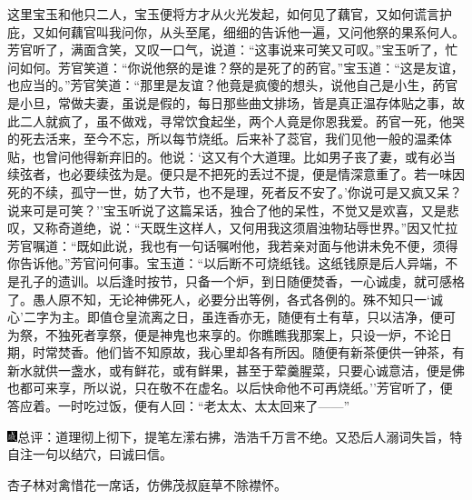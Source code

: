 这里宝玉和他只二人，宝玉便将方才从火光发起，如何见了藕官，又如何谎言护庇，又如何藕官叫我问你，从头至尾，细细的告诉他一遍，又问他祭的果系何人。芳官听了，满面含笑，又叹一口气，说道：``这事说来可笑又可叹。''宝玉听了，忙问如何。芳官笑道：``你说他祭的是谁？祭的是死了的菂官。''宝玉道：``这是友谊，也应当的。''芳官笑道：``那里是友谊？他竟是疯傻的想头，说他自己是小生，菂官是小旦，常做夫妻，虽说是假的，每日那些曲文排场，皆是真正温存体贴之事，故此二人就疯了，虽不做戏，寻常饮食起坐，两个人竟是你恩我爱。菂官一死，他哭的死去活来，至今不忘，所以每节烧纸。后来补了蕊官，我们见他一般的温柔体贴，也曾问他得新弃旧的。他说：`这又有个大道理。比如男子丧了妻，或有必当续弦者，也必要续弦为是。便只是不把死的丢过不提，便是情深意重了。若一味因死的不续，孤守一世，妨了大节，也不是理，死者反不安了。'你说可是又疯又呆？说来可是可笑？''宝玉听说了这篇呆话，独合了他的呆性，不觉又是欢喜，又是悲叹，又称奇道绝，说：``天既生这样人，又何用我这须眉浊物玷辱世界。''因又忙拉芳官嘱道：``既如此说，我也有一句话嘱咐他，我若亲对面与他讲未免不便，须得你告诉他。''芳官问何事。宝玉道：``以后断不可烧纸钱。这纸钱原是后人异端，不是孔子的遗训。以后逢时按节，只备一个炉，到日随便焚香，一心诚虔，就可感格了。愚人原不知，无论神佛死人，必要分出等例，各式各例的。殊不知只一`诚心'二字为主。即值仓皇流离之日，虽连香亦无，随便有土有草，只以洁净，便可为祭，不独死者享祭，便是神鬼也来享的。你瞧瞧我那案上，只设一炉，不论日期，时常焚香。他们皆不知原故，我心里却各有所因。随便有新茶便供一钟茶，有新水就供一盏水，或有鲜花，或有鲜果，甚至于荤羹腥菜，只要心诚意洁，便是佛也都可来享，所以说，只在敬不在虚名。以后快命他不可再烧纸。''芳官听了，便答应着。一时吃过饭，便有人回：``老太太、太太回来了------''

{\includegraphics[width=3mm]{../Images/00005}总评：道理彻上彻下，提笔左潆右拂，浩浩千万言不绝。又恐后人溺词失旨，特自注一句以结穴，曰诚曰信。}

{杏子林对禽惜花一席话，仿佛茂叔庭草不除襟怀。}
